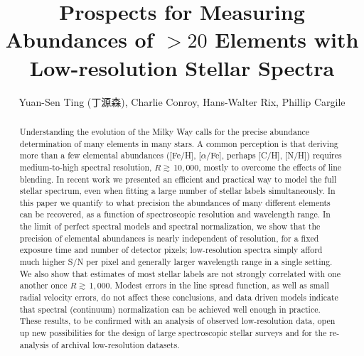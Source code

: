 \documentclass[iop]{emulateapj}
\begin{document}
\begin{CJK*}{UTF8}{gbsn}
\title{Prospects for Measuring Abundances of $>20$ Elements with \\ Low-resolution Stellar Spectra}
\author{Yuan-Sen Ting (丁源森), Charlie Conroy, Hans-Walter Rix, Phillip Cargile}



%
%
%
%
%
%
\begin{abstract}
Understanding the evolution of the Milky Way calls for the precise abundance determination of many elements in many stars. A common perception is that deriving more than a few elemental abundances ([Fe/H], [$\alpha$/Fe], perhaps [C/H], [N/H]) requires medium-to-high spectral resolution, $R \gtrsim \,$10$,$000, mostly to overcome the effects of line blending. In recent work \citep{rix16,tin16} we presented an efficient and practical way to model the full stellar spectrum, even when fitting a large number of stellar labels simultaneously. In this paper we quantify to what precision the abundances of many different elements can be recovered, as a function of spectroscopic resolution and wavelength range. In the limit of perfect spectral models and spectral normalization, we show that the precision of elemental abundances is nearly independent of resolution, for a fixed exposure time and number of detector pixels; low-resolution spectra simply afford much higher S/N per pixel and generally larger wavelength range in a single setting. We also show that estimates of most stellar labels are not strongly correlated with one another once $R \gtrsim \,$1$,$000. Modest errors in the line spread function, as well as small radial velocity errors, do not affect these conclusions, and data driven models indicate that spectral (continuum) normalization can be achieved well enough in practice. These results, to be confirmed with an analysis of observed low-resolution data, open up new possibilities for the design of large spectroscopic stellar surveys and for the re-analysis of archival low-resolution datasets.
\end{abstract}
 

\end{CJK*}
\end{document}
